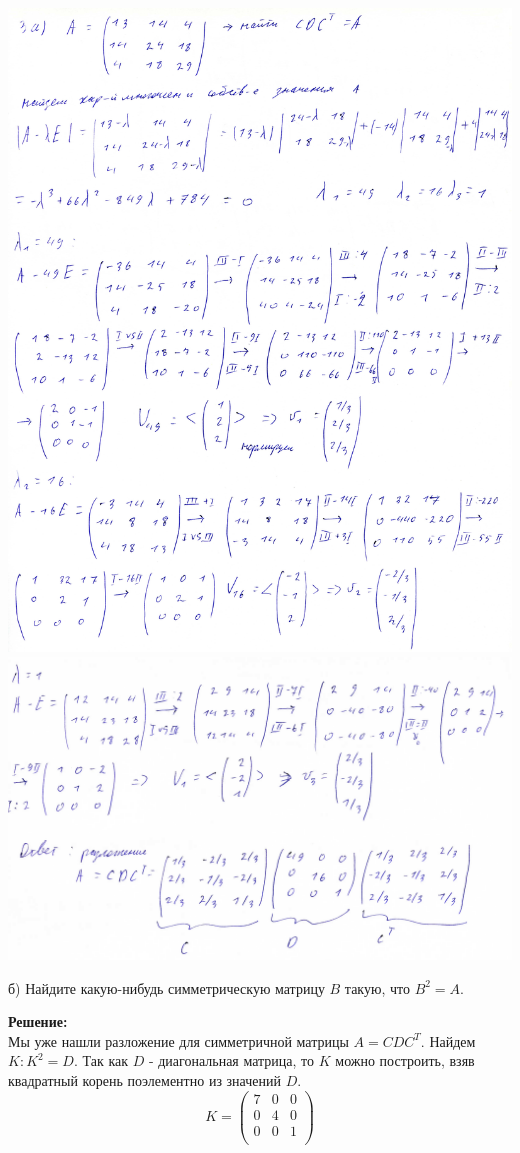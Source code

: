 \documentclass[a4paper,12pt]{article}
\begin{document}
\begin{enumerate}
\includegraphics[width=\textwidth]{img/img201-min.jpg}
\includegraphics[width=\textwidth]{img/img202.pdf}


б) Найдите какую-нибудь симметрическую матрицу $B$ такую, что $B^2 = A$.

\vspace{5pt}
\textbf{Решение:}\\
Мы уже нашли разложение для симметричной матрицы $A = C D C^T$.
Найдем $K: K^2 = D$. Так как $D$ - диагональная матрица, то $K$ можно построить, взяв квадратный корень поэлементно из значений $D$. 
$$K = \begin{pmatrix}
7&0&0\\
0&4&0\\
0&0&1\\
\end{pmatrix}$$


\end{enumerate}
\end{document}
